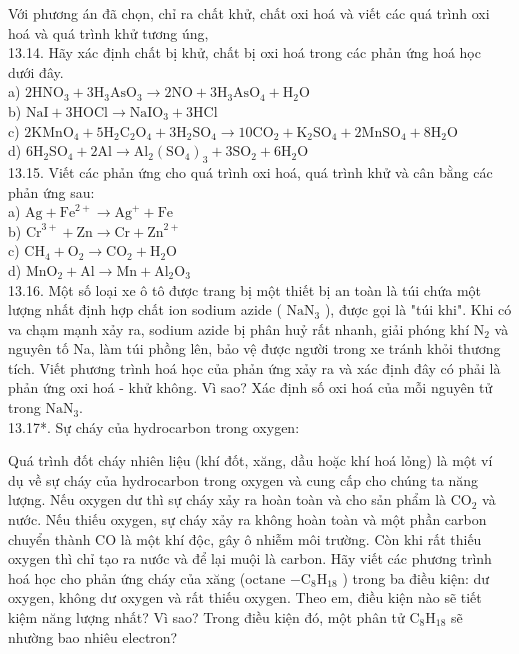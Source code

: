 \documentclass[10pt]{article}
\begin{document}
Với phương án đã chọn, chỉ ra chất khử, chất oxi hoá và viết các quá trình oxi hoá và quá trình khử tương úng,\\
13.14. Hãy xác định chất bị khử, chất bị oxi hoá trong các phản ứng hoá học dưới đây.\\
a) $2 \mathrm{HNO}_{3}+3 \mathrm{H}_{3} \mathrm{AsO}_{3} \rightarrow 2 \mathrm{NO}+3 \mathrm{H}_{3} \mathrm{AsO}_{4}+\mathrm{H}_{2} \mathrm{O}$\\
b) $\mathrm{NaI}+3 \mathrm{HOCl} \rightarrow \mathrm{NaIO}_{3}+3 \mathrm{HCl}$\\
c) $2 \mathrm{KMnO}_{4}+5 \mathrm{H}_{2} \mathrm{C}_{2} \mathrm{O}_{4}+3 \mathrm{H}_{2} \mathrm{SO}_{4} \rightarrow 10 \mathrm{CO}_{2}+\mathrm{K}_{2} \mathrm{SO}_{4}+2 \mathrm{MnSO}_{4}+8 \mathrm{H}_{2} \mathrm{O}$\\
d) $6 \mathrm{H}_{2} \mathrm{SO}_{4}+2 \mathrm{Al} \rightarrow \mathrm{Al}_{2}\left(\mathrm{SO}_{4}\right)_{3}+3 \mathrm{SO}_{2}+6 \mathrm{H}_{2} \mathrm{O}$\\
13.15. Viết các phản ứng cho quá trình oxi hoá, quá trình khử và cân bằng các phản ứng sau:\\
a) $\mathrm{Ag}+\mathrm{Fe}^{2+} \rightarrow \mathrm{Ag}^{+}+\mathrm{Fe}$\\
b) $\mathrm{Cr}^{3+}+\mathrm{Zn} \rightarrow \mathrm{Cr}+\mathrm{Zn}^{2+}$\\
c) $\mathrm{CH}_{4}+\mathrm{O}_{2} \rightarrow \mathrm{CO}_{2}+\mathrm{H}_{2} \mathrm{O}$\\
d) $\mathrm{MnO}_{2}+\mathrm{Al} \rightarrow \mathrm{Mn}+\mathrm{Al}_{2} \mathrm{O}_{3}$\\
13.16. Một số loại xe ô tô được trang bị một thiết bị an toàn là túi chứa một lượng nhất định hợp chất ion sodium azide ( $\mathrm{NaN}_{3}$ ), được gọi là "túi khi". Khi có va chạm mạnh xảy ra, sodium azide bị phân huỷ rất nhanh, giải phóng khí $\mathrm{N}_{2}$ và nguyên tố Na, làm túi phồng lên, bảo vệ được người trong xe tránh khỏi thương tích. Viết phương trình hoá học của phản ứng xảy ra và xác định đây có phải là phản ứng oxi hoá - khử không. Vì sao? Xác định số oxi hoá của mỗi nguyên tử trong $\mathrm{NaN}_{3}$.\\
13.17*. Sự cháy của hydrocarbon trong oxygen:

Quá trình đốt cháy nhiên liệu (khí đốt, xăng, dầu hoặc khí hoá lỏng) là một ví dụ về sự cháy của hydrocarbon trong oxygen và cung cấp cho chúng ta năng lượng. Nếu oxygen dư thì sự cháy xảy ra hoàn toàn và cho sản phẩm là $\mathrm{CO}_{2}$ và nước. Nếu thiếu oxygen, sự cháy xảy ra không hoàn toàn và một phần carbon chuyển thành CO là một khí độc, gây ô nhiễm môi trường. Còn khi rất thiếu oxygen thì chỉ tạo ra nước và để lại muội là carbon. Hãy viết các phương trình hoá học cho phản ứng cháy của xăng (octane $-\mathrm{C}_{8} \mathrm{H}_{18}$ ) trong ba điều kiện: dư oxygen, không dư oxygen và rất thiếu oxygen. Theo em, điều kiện nào sẽ tiết kiệm năng lượng nhất? Vì sao? Trong điều kiện đó, một phân tử $\mathrm{C}_{8} \mathrm{H}_{18}$ sẽ nhường bao nhiêu electron?
\end{document}
